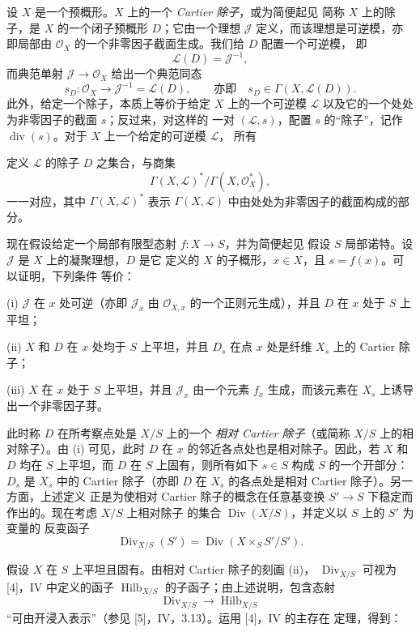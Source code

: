 设 $X$ 是一个预概形。$X$ 上的一个 \emph{Cartier 除子}，或为简便起见
简称 $X$ 上的除子，是 $X$ 的一个闭子预概形 $D$；它由一个理想
$\mathcal J$ 定义，而该理想是可逆模，亦即局部由
$\mathcal O_X$ 的一个非零因子截面生成。我们给 $D$ 配置一个可逆模，
即
\[
\mathcal L(D)=\mathcal J^{-1},
\]
而典范单射 $\mathcal J\longrightarrow\mathcal O_X$ 给出一个典范同态
\[
s_D:\mathcal O_X\longrightarrow\mathcal J^{-1}=\mathcal L(D),
\qquad\text{亦即}\quad s_D\in\Gamma(X,\mathcal L(D)).
\]
此外，给定一个除子，本质上等价于给定 $X$ 上的一个可逆模
$\mathcal L$ 以及它的一个处处为非零因子的截面 $s$；反过来，对这样的
一对 $(\mathcal L,s)$，配置 $s$ 的“除子”，记作
$\operatorname{div}(s)$。对于 $X$ 上一个给定的可逆模 $\mathcal L$，
所有

定义 $\mathcal L$ 的除子 $D$ 之集合，与商集
\[
\Gamma(X,\mathcal L)^*/\Gamma(X,\mathcal O_X^*),
\]
一一对应，其中 $\Gamma(X,\mathcal L)^*$ 表示
$\Gamma(X,\mathcal L)$ 中由处处为非零因子的截面构成的部分。

现在假设给定一个局部有限型态射 $f:X\longrightarrow S$，并为简便起见
假设 $S$ 局部诺特。设 $\mathcal J$ 是 $X$ 上的凝聚理想，$D$ 是它
定义的 $X$ 的子概形，$x\in X$，且 $s=f(x)$。可以证明，下列条件
等价：

\noindent (i) $\mathcal J$ 在 $x$ 处可逆（亦即 $\mathcal J_x$ 由
$\mathcal O_{X,x}$ 的一个正则元生成），并且 $D$ 在 $x$ 处于 $S$
上平坦；

\noindent (ii) $X$ 和 $D$ 在 $x$ 处均于 $S$ 上平坦，并且 $D_s$ 在点
$x$ 处是纤维 $X_s$ 上的 Cartier 除子；

\noindent (iii) $X$ 在 $x$ 处于 $S$ 上平坦，并且 $\mathcal J_x$
由一个元素 $f_x$ 生成，而该元素在 $X_s$ 上诱导出一个非零因子芽。

此时称 $D$ 在所考察点处是 $X/S$ 上的一个
\emph{相对 Cartier 除子}（或简称 $X/S$ 上的相对除子）。由 (i)
可见，此时 $D$ 在 $x$ 的邻近各点处也是相对除子。因此，若 $X$ 和
$D$ 均在 $S$ 上平坦，而 $D$ 在 $S$ 上固有，则所有如下 $s\in S$
构成 $S$ 的一个开部分：$D_s$ 是 $X_s$ 中的 Cartier 除子（亦即
$D$ 在 $X_s$ 的各点处是相对 Cartier 除子）。另一方面，上述定义
正是为使相对 Cartier 除子的概念在任意基变换
$S'\longrightarrow S$ 下稳定而作出的。现在考虑 $X/S$ 上相对除子
的集合 $\operatorname{Div}(X/S)$，并定义以 $S$ 上的 $S'$ 为变量的
反变函子
\[
\operatorname{Div}_{X/S}(S')=
\operatorname{Div}(X\times_SS'/S').
\]

假设 $X$ 在 $S$ 上平坦且固有。由相对 Cartier 除子的刻画 (ii)，
$\operatorname{Div}_{X/S}$ 可视为 [4]，IV 中定义的函子
$\operatorname{Hilb}_{X/S}$ 的子函子；由上述说明，包含态射
\[
\operatorname{Div}_{X/S}\longrightarrow\operatorname{Hilb}_{X/S}
\]
“可由开浸入表示”（参见 [5]，IV，3.13）。运用 [4]，IV 的主存在
定理，得到：

